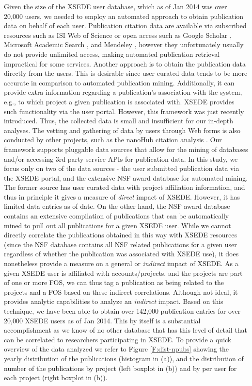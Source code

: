 \documentclass{sig-alternate}
\begin{document}
Given the size of the XSEDE user database, which as of Jan 2014 was over 20,000 users, we needed to employ an automated approach to obtain publication data on behalf of each user. Publication citation data are available via subscribed resources such as ISI Web of Science \cite{www-isiwos} or open access such as Google Scholar \cite{www-googlescholar}, Microsoft Academic Search \cite{www-msas}, and Mendeley \cite{www-mendeley}, however they unfortunately usually do not provide unlimited access, making automated publication retrieval impractical for some services.  Another approach is to obtain the publication data directly from the users. This is desirable since user curated data tends to be more accurate in comparison to automated publication mining. Additionally, it can provide extra information regarding a publication's association with the system, e.g., to which project a given publication is associated with. XSEDE provides such functionality via the user portal. However, this framework was just recently introduced. Thus, the collected data is small and insufficient for our in-depth analyses. The vetting and gathering of data by users through Web forms is also conducted by other projects, such as the nanoHub citation analysis \cite{www-nanohubcite}.  Our framework supports pluggable data sources that allow for the mining of databases and/or accessing 3rd party service APIs for publication data. In this study, we focus only on two of the data sources - the user submitted publication data via the XSEDE portal, and the extensive NSF award database for automated mining. The former source has user curated data with project affiliation information, and thus in principle it gives a measure of \emph{direct} impact of XSEDE. However, it has limited data entries as of date. On the other hand, the NSF award database contains an extensive compilation of publications that can be automatically mined to pull out all publications for a given XSEDE user. While we cannot directly correlate the publications obtained in this way with XSEDE resources (since the NSF database contains all NSF related publications for a given user regardless of whether the publication was associated with XSEDE use), it does nonetheless provide a measure on a general or \emph{indirect} impact of XSEDE. As a given XSEDE user is affiliated with accounts/projects, and the projects are part of one or more FOS, we can thus tag a publication as being related to the projects and a FOS based on these indirect correlations. Although not ideal, it provides analytic capabilities to analyze an \emph{indirect} impact.  Based on this technique, we have been able to obtain over 142,000 publication entries for over 20,000 XSEDE users as of Jan 2014.  This by itself is a substantial accomplishment as we know of no other database that has this level of detail that can be correlated to researchers participating in XSEDE. To provide a quick overview of the data analyzed we refer to Figure \ref{F:dist-npubs} showing the yearly distribution of the publications (histogram in (a)), and the distribution of number of the publications by project (left boxplot in (b)) and by per user for each project (right boxplot in (b)).
 
\end{document}
